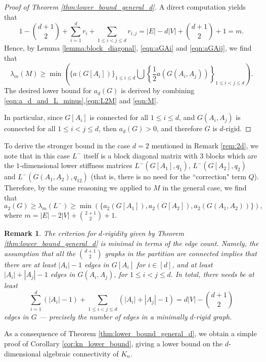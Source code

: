 \documentclass[a4paper,11pt]{article}
\theoremstyle{plain}
\newtheorem{remark}[theorem]{\bf Remark}
\theoremstyle{definition}
\begin{document}
\begin{proof}[Proof of Theorem \ref{thm:lower_bound_general_d}]
A direct computation yields that
\[
1-\binom{d+1}{2}+\sum_{i=1}^{d}r_i+\sum_{1\le i<j\le d}r_{i,j} = |E| - d|V| + \binom{d+1}{2} + 1=m.
\]
Hence, by Lemma \ref{lemma:block_diagonal}, \eqref{eqn:aGAi} and \eqref{eqn:aGAij}, we find that
\begin{equation}\label{eqn:M}
\lambda_{m}(M) \ge  
\min\left(\bigg\{a(G[A_i]) \bigg\}_{1\leq i\leq d} \bigcup\left\{\frac{1}{2}a(G(A_i,A_j))\right\}_{1\leq i<j\leq d}\right).
\end{equation}
The desired lower bound for $a_d(G)$ is derived by combining \eqref{eqn:a_d_and_L_minus},\eqref{eqn:L2M} and \eqref{eqn:M}.

In particular, since $G[A_i]$ is connected for all $1\leq i\leq d$, and $G(A_i,A_j)$ is connected for all $1\leq i<j\leq d$, then $a_d(G)>0$, and therefore $G$ is $d$-rigid.
\end{proof}

To derive the stronger bound in the case $d=2$ mentioned in Remark \ref{rem:2d}, we note that in this case $L^-$ itself is a block diagonal matrix with $3$ blocks which are the $1$-dimensional lower stiffness matrices $L^-(G[A_1],q_1)$, $L^-(G[A_2],q_2)$ and $L^-(G(A_1,A_2),q_{12})$ (that is, there is no need for the ``correction" term $Q$). Therefore, by the same reasoning we applied to $M$ in the general case, we find that
\[
a_2(G)\ge \lambda_{m}(L^-) \ge \min(\{a_2(G[A_1]),a_2(G[A_2]),a_2(G(A_1,A_2))\}),
\]
where $m=|E|-2|V|+\binom{2+1}{2}+1$.

\begin{remark}
    The criterion for $d$-rigidity given by Theorem \ref{thm:lower_bound_general_d} is minimal in terms of the edge count. Namely, the assumption that all the $\binom {d+1}2$ graphs in the partition are connected implies that there are at least $|A_i|-1$ edges in $G[A_i]$ for $i\in [d]$, and at least $|A_i|+|A_j|-1$ edges in $G(A_i,A_j)$, for  $1\le i<j\le d.$ In total, there needs be at least
    \[
    \sum_{i=1}^{d}(|A_i|-1) + \sum_{1\le i<j\le d}(|A_i|+|A_j|-1) = d|V|-\binom{d+1}{2}
    \]
    edges in $G$ --- precisely the number of edges in a minimally $d$-rigid graph.
\end{remark}



As a consequence of Theorem \ref{thm:lower_bound_general_d}, we obtain a simple proof of Corollary \ref{cor:kn_lower_bound}, giving a lower bound on the $d$-dimensional algebraic connectivity of $K_n$.
\end{document}
